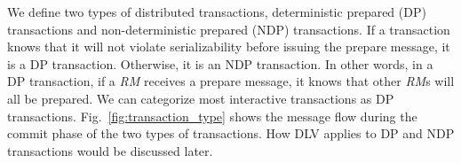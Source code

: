 \documentclass[conference]{IEEEtran}
\begin{document}
We define two types of distributed transactions,  deterministic prepared (DP) transactions and non-deterministic prepared (NDP) transactions.
If a transaction knows that it will not violate serializability before issuing the prepare message, it is a DP transaction. Otherwise, it is an NDP transaction. 
In other words, in a DP transaction, if a \emph{RM} receives a prepare message, it knows that other \emph{RM}s will all be prepared.
We can categorize most interactive transactions as DP transactions.
Fig.~\ref{fig:transaction_type} shows the message flow during the commit phase of the two types of transactions.
How DLV applies to DP and NDP transactions would be discussed later.
\end{document}
